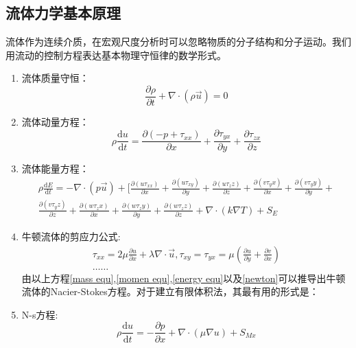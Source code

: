 \documentclass[12pt]{article}
\newcommand{\ud}{\mathrm{d}}
\begin{document}
\subsection{流体力学基本原理}
流体作为连续介质，在宏观尺度分析时可以忽略物质的分子结构和分子运动。我们用流动的控制方程表达基本物理守恒律的数学形式。
\begin{enumerate}
\item 流体质量守恒：
\begin{equation}\label{mass equ}
\frac{\partial\rho}{\partial t}+\nabla\cdot(\rho\vec u)=0
\end{equation}
\item 流体动量方程：
\begin{equation}\label{momen equ}
\rho \frac{\ud u}{\ud t}=\frac{\partial(-p+\tau_{xx})}{\partial x}+\frac{\partial \tau_{yx}}{\partial y}+\frac{\partial \tau_{zx}}{\partial z}
\end{equation}
\item 流体能量方程：
\begin{equation}
\label{energy equ}
\begin{split}
\rho\frac{\ud E}{\ud t}=-\nabla \cdot(p\vec u)+[\frac{\partial(u\tau_{xx})}{\partial x}+\frac{\partial(u\tau_{xy})}{\partial y}+\frac{\partial(u\tau_zz)}{\partial z}+\frac{\partial(v\tau_yx)}{\partial x}
+\frac{\partial(v\tau_yy)}{\partial y}+\\  \frac{\partial(v\tau_yz)}{\partial z}+\frac{\partial(w\tau_zx)}{\partial x}+\frac{\partial(w\tau_zy)}{\partial y}+\frac{\partial(w\tau_zz)}{\partial z}+\nabla \cdot(k\nabla T)+S_E
\end{split}
\end{equation}
\item 牛顿流体的剪应力公式:
\label{newton}
\begin{equation}
\begin{split}
\tau_{xx}=2\mu\frac{\partial u}{\partial x} +\lambda\nabla\cdot\vec u,  \tau_{xy}=\tau_{yx}=\mu(\frac{\partial u}{\partial y}+\frac{\partial v}{\partial x})\\ \dots\dots
\end{split}
\end{equation}
由以上方程\ref{mass equ},\ref{momen equ},\ref{energy equ}以及\ref{newton}可以推导出牛顿流体的Nacier-Stokes方程。对于建立有限体积法，其最有用的形式是：
\item N-s方程:
\begin{equation}
\rho \frac{\ud u}{\ud t}=-\frac{\partial p}{\partial x}+\nabla\cdot(\mu\nabla u)+S_{Mx}
\end{equation}

\end{enumerate}
\end{document}
